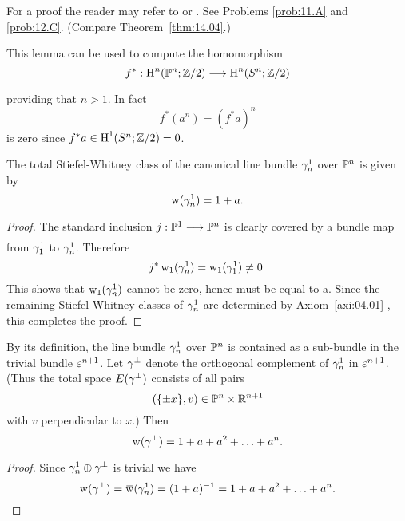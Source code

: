 \documentclass[../main]{subfiles}
\begin{document}
For a proof the reader may refer to \cite[$\S$ 4.3.3]{hilton1961} or \cite[p. 264]{spanier1981}. See Problems \ref{prob:11.A} and \ref{prob:12.C}. (Compare Theorem~\ref{thm:14.04}.)

\begin{remark}
\label{rem:04.02}
This lemma can be used to compute the homomorphism
\[
f^*: \homology^n(\projective^{n}; \mathbb{Z} / 2) \varrightarrow{} \homology^n(S^n ; \mathbb{Z} / 2)
\]
providing that $n>1$. In fact
\[
f^*(a^n)=(f^* a)^n
\]
is zero since $f^* a \in \operatorname{H}^1(S^n ; \mathbb{Z} / 2)=0$.
\end{remark}

\begin{example}
\label{exa:04.02}
The total Stiefel-Whitney class of the canonical line bundle $\gamma_{n}^{1}$ over $\mathbb{P}^{n}$ is given by
\[
\operatorname{w}(\gamma_{n}^{1})=1+a .
\]
\end{example}

\begin{proof}
The standard inclusion $j: \projective^1 \varrightarrow{} \projective^n$ is clearly covered by a bundle map from $\gamma_1^1$ to $\gamma_{n}^1$. Therefore
\[
j^* \operatorname{w}_1(\gamma_n^1)=\operatorname{w}_1(\gamma_1^1) \neq 0 .
\]
This shows that $\operatorname{w}_1(\gamma_n^1)$ cannot be zero, hence must be equal to a. Since the remaining Stiefel-Whitney classes of $\gamma_n^1$ are determined by Axiom~\ref{axi:04.01} , this completes the proof.
\end{proof}

\begin{example}
\label{exa:04.03}
By its definition, the line bundle $\gamma_n^1$ over $\mathbb{P}^n$ is contained as a \mbox{sub-bundle} in the trivial bundle $\varepsilon^{n+1}$. Let $\gamma^{\perp}$ denote the orthogonal \mbox{complement} of $\gamma_{n}^{1}$ in $\varepsilon^{n+1}$. (Thus the total space $E(\gamma^{\perp})$ consists of all pairs
\[
(\{\pm x\}, v) \in \mathbb{P}^{n} \times \mathbb{R}^{n+1}
\]
with $v$ perpendicular to $x$.) Then
\[
\operatorname{w}(\gamma^{\perp})=1+a+a^2+\ldots+a^n .
\]
\end{example}

\begin{proof}
Since $\gamma_{n}^{1} \oplus \gamma^{\perp}$ is trivial we have
\[
\sw(\tautological^{\perp})=\xoverline{\sw}(\tautological_n^1)=(1+a)^{-1}=1+a+a^2+\ldots+a^n .
\]
\end{proof}
\end{document}
